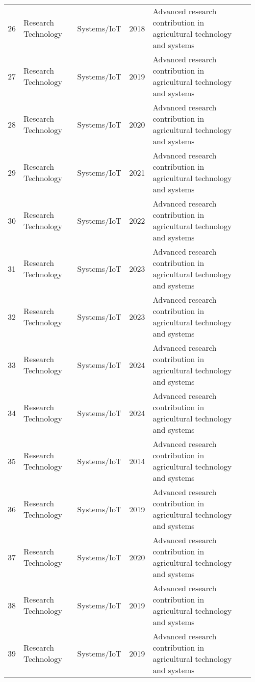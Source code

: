 \begin{table*}[htbp]
\begin{tabular}{p{}p{}p{}p{}p{}p{}}
 26 & Research Technology & Systems/IoT & 2018 & Advanced research contribution in agricultural technology and systems & \cite{wang2018design} \\
 27 & Research Technology & Systems/IoT & 2019 & Advanced research contribution in agricultural technology and systems & \cite{wang2019design} \\
 28 & Research Technology & Systems/IoT & 2020 & Advanced research contribution in agricultural technology and systems & \cite{wang2020design} \\
 29 & Research Technology & Systems/IoT & 2021 & Advanced research contribution in agricultural technology and systems & \cite{wang2021design} \\
 30 & Research Technology & Systems/IoT & 2022 & Advanced research contribution in agricultural technology and systems & \cite{wang2022design} \\
 31 & Research Technology & Systems/IoT & 2023 & Advanced research contribution in agricultural technology and systems & \cite{wang2023biologically} \\
 32 & Research Technology & Systems/IoT & 2023 & Advanced research contribution in agricultural technology and systems & \cite{wang2023design} \\
 33 & Research Technology & Systems/IoT & 2024 & Advanced research contribution in agricultural technology and systems & \cite{wang2024design} \\
 34 & Research Technology & Systems/IoT & 2024 & Advanced research contribution in agricultural technology and systems & \cite{wang2024yolov10} \\
 35 & Research Technology & Systems/IoT & 2014 & Advanced research contribution in agricultural technology and systems & \cite{wei2014automatic} \\
 36 & Research Technology & Systems/IoT & 2019 & Advanced research contribution in agricultural technology and systems & \cite{williams2019robotic} \\
 37 & Research Technology & Systems/IoT & 2020 & Advanced research contribution in agricultural technology and systems & \cite{williams2020improvements} \\
 38 & Research Technology & Systems/IoT & 2019 & Advanced research contribution in agricultural technology and systems & \cite{xiang2019fruit} \\
 39 & Research Technology & Systems/IoT & 2019 & Advanced research contribution in agricultural technology and systems & \cite{xiong2019development} \\

\end{tabular}
\end{table*}
